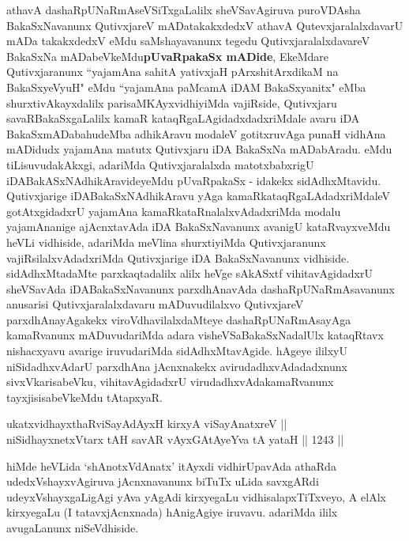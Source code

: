 
\begin{artha}
athavA dashaRpUNaRmAseVSiTxgaLalilx sheVSavAgiruva puroVDAsha BakaSxNavanunx QutivxjareV mADatakakxdedxV athavA QutevxjaralalxdavarU mADa takakxdedxV eMdu saMshayavanunx tegedu QutivxjaralalxdavareV BakaSxNa mADabeVkeMdu\textbf{pUvaRpakaSx mADide}, EkeMdare Qutivxjaranunx ``yajamAna sahitA yativxjaH pArxshitArxdikaM na BakaSxyeVyuH" eMdu ``yajamAna paMcamA iDAM BakaSxyanitx" eMba shurxtivAkayxdalilx parisaMKAyxvidhiyiMda vajiRside, Qutivxjaru savaRBakaSxgaLalilx kamaR kataqRgaLAgidadxdadxriMdale avaru iDA BakaSxmADabahudeMba adhikAravu modaleV gotitxruvAga punaH vidhAna mADidudx yajamAna matutx Qutivxjaru iDA BakaSxNa mADabAradu. eMdu tiLisuvudakAkxgi, adariMda Qutivxjaralalxda matotxbabxrigU iDABakASxNAdhikAravideyeMdu pUvaRpakaSx - idakekx sidAdhxMtavidu. Qutivxjarige iDABakaSxNAdhikAravu yAga kamaRkataqRgaLAdadxriMdaleV gotAtxgidadxrU yajamAna kamaRkataRnalalxvAdadxriMda modalu yajamAnanige ajAcnxtavAda iDA BakaSxNavanunx avanigU kataRvayxveMdu heVLi vidhiside, adariMda meVlina shurxtiyiMda Qutivxjaranunx vajiRsilalxvAdadxriMda Qutivxjarige iDA BakaSxNavanunx vidhiside. sidAdhxMtadaMte parxkaqtadalilx alilx heVge sAkASxtf vihitavAgidadxrU sheVSavAda iDABakaSxNavanunx parxdhAnavAda dashaRpUNaRmAsavanunx anusarisi Qutivxjaralalxdavaru mADuvudilalxvo QutivxjareV parxdhAnayAgakekx viroVdhavilalxdaMteye dashaRpUNaRmAsayAga kamaRvanunx mADuvudariMda adara visheVSaBakaSxNadalUlx kataqRtavx nishacxyavu avarige iruvudariMda sidAdhxMtavAgide. hAgeye ililxyU niSidadhxvAdarU parxdhAna jAcnxnakekx avirudadhxvAdadadxnunx sivxVkarisabeVku, vihitavAgidadxrU virudadhxvAdakamaRvanunx tayxjisisabeVkeMdu tAtapxyaR.
\end{artha}

\begin{shl}
ukatxvidhayxthaRviSayAdAyxH kirxyA viSayAnatxreV || \\
niSidhayxnetxV\s tarx tAH savAR vAyxGAtAyeYva tA yataH \hfill || 1243 ||  
\end{shl}

\begin{artha}
hiMde heVLida `shAnotxVdAnatx'  itAyxdi vidhirUpavAda athaRda udedxVshayxvAgiruva jAcnxnavanunx biTuTx uLida savxgARdi udeyxVshayxgaLigAgi yAva yAgAdi kirxyegaLu vidhisalapxTiTxveyo, A elAlx kirxyegaLu (I tatavxjAcnxnada) hAnigAgiye iruvavu. adariMda ililx avugaLanunx niSeVdhiside.
\end{artha}

